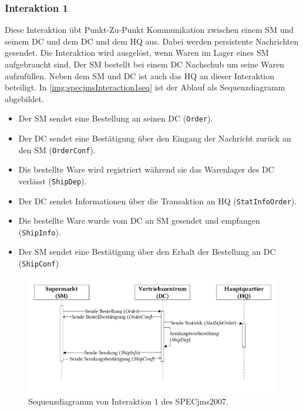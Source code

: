 \subsubsection{Interaktion 1}
\label{sec:interaction1desc}
Diese Interaktion übt Punkt-Zu-Punkt Kommunikation zwischen einem SM und seinem DC und dem DC und dem HQ aus. Dabei werden persistente Nachrichten gesendet. Die Interaktion wird ausgelöst, wenn Waren im Lager eines SM aufgebraucht sind. Der SM bestellt bei einem DC Nachschub um seine Waren aufzufüllen. Neben dem SM und DC ist auch das HQ an dieser Interaktion beteiligt. In \autoref{img:specjmsInteraction1seq} ist der Ablauf als Sequenzdiagramm abgebildet. 
\begin{itemize}
    \item Der SM sendet eine Bestellung an seinen DC (\texttt{Order}).
    \item Der DC sendet eine Bestätigung über den Eingang der Nachricht zurück an den SM (\texttt{OrderConf}).
    \item Die bestellte Ware wird registriert während sie das Warenlager des DC verlässt (\texttt{ShipDep}).
    \item Der DC sendet Informationen über die Transaktion an HQ (\texttt{StatInfoOrder}).
    \item Die bestellte Ware wurde vom DC an SM gesendet und empfangen (\texttt{ShipInfo}).
    \item Der SM sendet eine Bestätigung über den Erhalt der Bestellung an DC (\texttt{ShipConf})
\end{itemize}

\begin{figure}
\center
  \includegraphics[width=1\textwidth]{images/evaluation/specjms/evaluationInteraktion1seq.pdf}
  \caption{Sequenzdiagramm von Interaktion 1 des SPECjms2007.}
  \label{img:specjmsInteraction1seq}
\end{figure}


